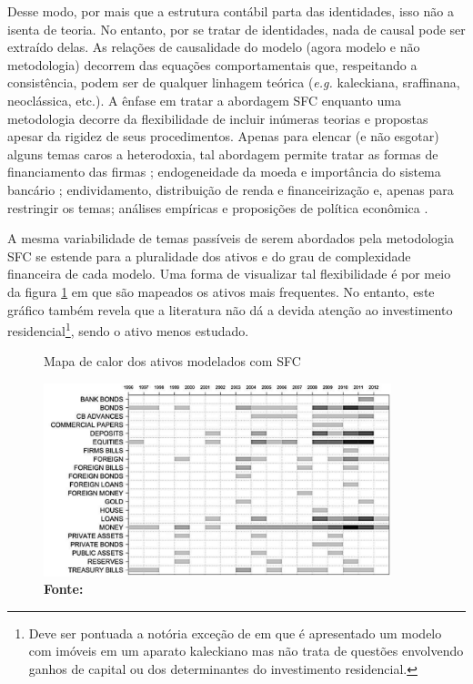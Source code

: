 Desse modo, por mais que a estrutura contábil parta das identidades, isso não a isenta de teoria. No entanto, por se tratar de identidades, nada de causal pode ser extraído delas. As relações de causalidade do modelo (agora modelo e não metodologia) decorrem das equações comportamentais que, respeitando a consistência, podem ser de qualquer linhagem teórica (\textit{e.g.} kaleckiana, sraffinana, neoclássica, etc.). A ênfase em tratar a abordagem SFC enquanto uma metodologia decorre da flexibilidade de incluir inúmeras teorias e propostas apesar da rigidez de seus procedimentos. Apenas para elencar (e não esgotar) alguns temas caros a heterodoxia, tal abordagem permite tratar as formas de financiamento das firmas \cites{asimakopulos_kalecki_1983}{skott_finance_1988}{messori_financing_1991}; endogeneidade da moeda e importância do sistema bancário \cites{messori_financing_1991}{dow_horizontalism:_1996}{arestis_theoretical_1996}{godley_money_1999}{lavoie_note_1999}{lima_macrodynamics_2007}; endividamento, distribuição de renda e financeirização \cites{palley_inside_1996}{wolfson_irving_1996}{palley_money_1997}{palley_financial_2002}{dos_santos_revisiting_2009}{palley_inside_2010}{hein_finance-dominated_2012} e, apenas para restringir os temas; análises empíricas e proposições de política econômica \cites{godley_seven_1999}{godley_fiscal_2007}{godley_simple_2007}{arestis_income_2011}{zezza_design_2019}. 

A mesma variabilidade de temas passíveis de serem abordados pela metodologia SFC se estende para a pluralidade dos ativos e do grau de complexidade financeira de cada modelo. Uma forma de visualizar tal flexibilidade é por meio da figura \ref{Heatmap} em que são mapeados os ativos mais frequentes. No entanto, este gráfico também revela que a literatura não dá a devida atenção ao investimento residencial\footnote{Deve ser pontuada a notória exceção de \textcite{zezza_u.s._2008} em que é apresentado um modelo com imóveis em um aparato kaleckiano mas não trata de questões envolvendo ganhos de capital ou dos determinantes do investimento residencial.}, sendo o ativo menos estudado. 
\begin{figure}
    \centering
    \caption{Mapa de calor dos ativos modelados com SFC}
    \label{Heatmap}
    \includegraphics[width = 0.9\textwidth]{Modelo/Caverzassi_Heatmap.png}
    \caption*{\textbf{Fonte:} \textcite[p.~4]{caverzasi_stock-flow_2013}}
\end{figure}


